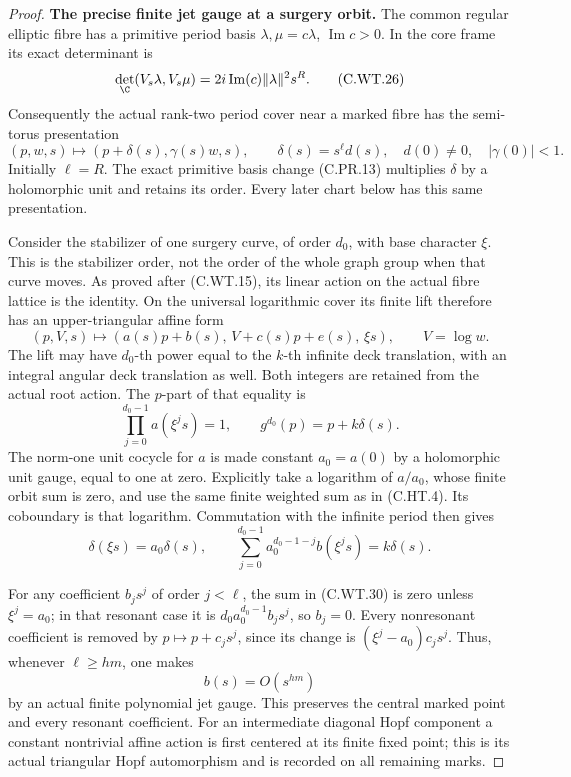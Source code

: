 \begin{proof}
\par\medskip\noindent\textbf{The precise finite jet gauge at a surgery orbit.}
The common regular elliptic fibre has a
primitive period basis \(\lambda,\mu=c\lambda\),
\(\operatorname{Im}c>0\). In the core frame
its exact determinant is
\[
 \det_{\C}(V_s\lambda,V_s\mu)
              =2i\operatorname{Im}(c)\|\lambda\|^2s^R .
 \tag{C.WT.26}
\]
Consequently the actual rank-two period
cover near a marked fibre has the
semi-torus presentation
\[
 (p,w,s)\longmapsto(p+\delta(s),\gamma(s)w,s),
 \qquad \delta(s)=s^{\ell} d(s),\quad d(0)\ne0,
                     \quad|\gamma(0)|<1 .
 \tag{C.WT.27}
\]
Initially \(\ell=R\). The exact primitive
basis change (C.PR.13) multiplies \(\delta\)
by a holomorphic unit and retains its
order. Every later chart below has this
same presentation.

Consider the stabilizer of one surgery
curve, of order \(d_0\), with base
character \(\xi\). This is the stabilizer
order, not the order of the whole
graph group when that curve moves.
As proved after (C.WT.15), its linear
action on the actual fibre lattice
is the identity. On the universal
logarithmic cover its finite lift
therefore has an upper-triangular
affine form
\[
 (p,V,s)\longmapsto
    (a(s)p+b(s),\,V+c(s)p+e(s),\,\xi s),
                     \qquad V=\log w .
 \tag{C.WT.28}
\]
The lift may have \(d_0\)-th power
equal to the \(k\)-th infinite deck
translation, with an integral
angular deck translation as well.
Both integers are retained from the
actual root action. The \(p\)-part
of that equality is
\[
 \prod_{j=0}^{d_0-1}a(\xi^j s)=1,\qquad
                 g^{d_0}(p)=p+k\delta(s).
 \tag{C.WT.29}
\]
The norm-one unit cocycle for \(a\)
is made constant \(a_0=a(0)\) by
a holomorphic unit gauge, equal
to one at zero. Explicitly take
a logarithm of \(a/a_0\), whose
finite orbit sum is zero, and
use the same finite weighted
sum as in (C.HT.4). Its
coboundary is that logarithm.
Commutation with the infinite
period then gives
\[
 \delta(\xi s)=a_0\delta(s),\qquad
 \sum_{j=0}^{d_0-1}a_0^{d_0-1-j}b(\xi^j s)
                                      =k\delta(s).
 \tag{C.WT.30}
\]

For any coefficient \(b_j s^j\)
of order \(j<\ell\), the sum
in (C.WT.30) is zero unless
\(\xi^j=a_0\); in that resonant
case it is
\(d_0 a_0^{d_0-1}b_j s^j\),
so \(b_j=0\). Every nonresonant
coefficient is removed by
\(p\mapsto p+c_j s^j\), since
its change is
\((\xi^j-a_0)c_j s^j\).
Thus, whenever \(\ell\ge hm\),
one makes
\[
                               b(s)=O(s^{hm})
 \tag{C.WT.31}
\]
by an actual finite polynomial
jet gauge. This preserves the
central marked point and every
resonant coefficient. For an
intermediate diagonal Hopf
component a constant nontrivial
affine action is first centered
at its finite fixed point;
this is its actual triangular
Hopf automorphism and is
recorded on all remaining
marks.


\end{proof}
